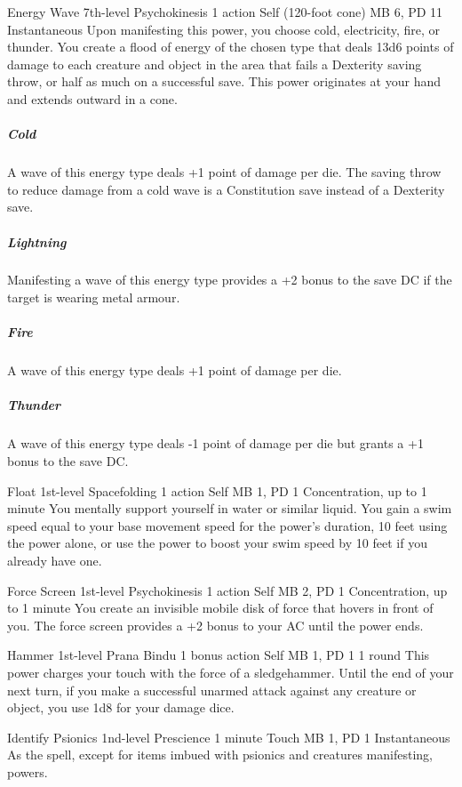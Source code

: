 \DndPowerHeader%
  {Energy Wave}
  {7th-level Psychokinesis}
  {1 action}
  {Self (120-foot cone)}
  {MB 6, PD 11}
  {Instantaneous}
  Upon manifesting this power,
  you choose cold, electricity, fire, or thunder.
  You create a flood of energy of the chosen type
  that deals 13d6 points of damage
  to each creature and object in the area
  that fails a Dexterity saving throw,
  or half as much on a successful save.
  This power originates at your hand
  and extends outward in a cone.
  \subparagraph{Cold}
    A wave of this energy type deals +1 point
    of damage per die.
    The saving throw to reduce damage from a cold wave
    is a Constitution save instead of a Dexterity save.  
  \subparagraph{Lightning}
    Manifesting a wave of this energy type
    provides a +2 bonus to the save DC if the target is wearing
    metal armour.
  \subparagraph{Fire}
    A wave of this energy type deals +1 point of damage per die.
  \subparagraph{Thunder}
    A wave of this energy type deals -1 point of damage per die
    but grants a +1 bonus to the save DC.

\DndPowerHeader%
  {Float}
  {1st-level Spacefolding}
  {1 action}
  {Self}
  {MB 1, PD 1}
  {Concentration, up to 1 minute}
You mentally support yourself in water or similar liquid.
You gain a swim speed equal to your base movement speed for
the power's duration, 10 feet using the power alone,
or use the power to boost your swim speed by 10 feet if you already have one.

\DndPowerHeader%
  {Force Screen}
  {1st-level Psychokinesis}
  {1 action}
  {Self}
  {MB 2, PD 1}
  {Concentration, up to 1 minute}
You create an invisible mobile disk of force that hovers in front of you.
The force screen provides a +2 bonus to your AC until the power ends.

\DndPowerHeader%
  {Hammer}
  {1st-level Prana Bindu}
  {1 bonus action}
  {Self}
  {MB 1, PD 1}
  {1 round}
This power charges your touch with the force of a sledgehammer.
Until the end of your next turn,
if you make a successful unarmed attack against any creature or object,
you use 1d8 for your damage dice.

\DndPowerHeader%
  {Identify Psionics}
  {1nd-level Prescience}
  {1 minute}
  {Touch}
  {MB 1, PD 1}
  {Instantaneous}
As the  spell,
except for items imbued with psionics
and creatures manifesting, powers.

